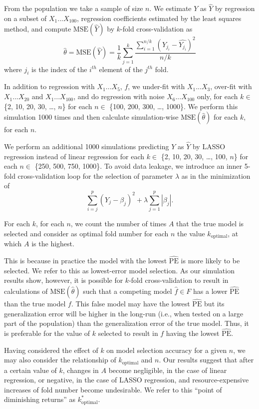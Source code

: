 \documentclass[
  12pt,
]{article}
\begin{document}
From the population we take a sample of size \(n\). We estimate \(Y\) as
\(\hat{Y}\) by regression on a subset of \(X_1...X_{100}\), regression
coefficients estimated by the least squares method, and compute
\(\mathrm{MSE}(\hat{Y})\) by \(k\)-fold cross-validation as
\[\hat{\theta} = \mathrm{MSE}(\hat{Y}) = \frac{1}{k}\sum_{j=1}^{k}\frac{\sum_{i=1}^{n/k}(Y_{j_i} - \hat{Y_{j_i}})^2}{n/k}\]
where \(j_i\) is the index of the \(i^{th}\) element of the \(j^{th}\)
fold.

In addition to regression with \(X_1...X_5\), \(f\), we under-fit with
\(X_1...X_3\), over-fit with \(X_1...X_{20}\) and \(X_1...X_{100}\), and
do regression with noise \(X_6...X_{100}\) only, for each \(k \in\) \{2,
10, 20, 30, \ldots, \(n\)\} for each \(n \in\) \{100, 200, 300, \ldots,
1000\}. We perform this simulation 1000 times and then calculate
simulation-wise \(\mathrm{MSE}(\hat{\theta})\) for each \(k\), for each
\(n\).

We perform an additional 1000 simulations predicting \(Y\) as
\(\hat{Y}\) by LASSO regression instead of linear regression for each
\(k \in\) \{2, 10, 20, 30, \ldots, 100, \(n\)\} for each \(n \in\)
\{250, 500, 750, 1000\}. To avoid data leakage, we introduce an inner
5-fold cross-validation loop for the selection of parameter \(\lambda\)
as in the minimization of
\[\sum_{i=j}^{p}(Y_j - \beta_j)^2 + \lambda\sum_{j=1}^{p}|\beta_j|.\]

For each \(k\), for each \(n\), we count the number of times \(A\) that
the true model is selected and consider as optimal fold number for each
\(n\) the value \(k_\mathrm{optimal}\), at which \(A\) is the highest.

This is because in practice the model with the lowest
\(\mathrm{\widehat{PE}}\) is more likely to be selected. We refer to
this as lowest-error model selection. As our simulation results show,
however, it is possible for \(k\)-fold cross-validation to result in
calculations of \(\mathrm{MSE}(\hat{\theta})\) such that a competing
model \(\hat{f} \in F\) has a lower \(\mathrm{\widehat{PE}}\) than the
true model \(f\). This false model may have the lowest
\(\mathrm{\widehat{PE}}\) but its generalization error will be higher in
the long-run (i.e., when tested on a large part of the population) than
the generalization error of the true model. Thus, it is preferable for
the value of \(k\) selected to result in \(f\) having the lowest
\(\mathrm{\widehat{PE}}\).

Having considered the effect of \(k\) on model selection accuracy for a
given \(n\), we may also consider the relationship of
\(k_\mathrm{optimal}\) and \(n\). Our results suggest that after a
certain value of \(k\), changes in \(A\) become negligible, in the case
of linear regression, or negative, in the case of LASSO regression, and
resource-expensive increases of fold number become undesirable. We refer
to this ``point of diminishing returns'' as \(k_\mathrm{optimal}^*\).
\end{document}
